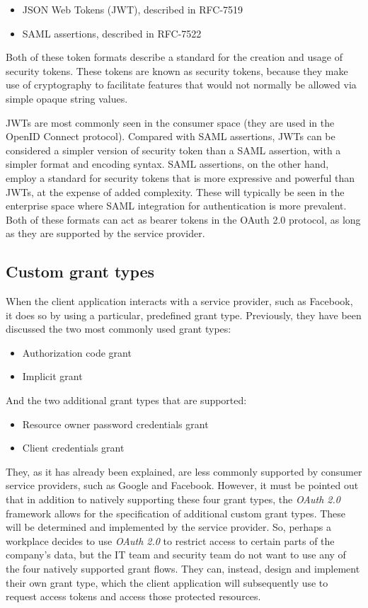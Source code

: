 \begin{itemize}
    \item JSON Web Tokens (JWT), described in RFC-7519 \cite{RFC7519}
    \item SAML assertions, described in RFC-7522
\end{itemize}

Both of these token formats describe a standard for the creation and usage of security tokens. These tokens are known as security tokens, because they make use of cryptography to facilitate features that would not normally be allowed via simple opaque string values.

JWTs are most commonly seen in the consumer space (they are used in the OpenID Connect protocol). Compared with SAML assertions, JWTs can be considered a simpler version of security token than a SAML assertion, with a simpler format and encoding syntax. SAML assertions, on the other hand, employ a standard for security tokens that is more expressive and powerful than JWTs, at the expense of added complexity. These will typically be seen in the enterprise space where SAML integration for authentication is more prevalent. Both of these formats can act as bearer tokens in the OAuth 2.0 protocol, as long as they are supported by the service provider.


\subsection{Custom grant types}
When the client application interacts with a service provider, such as Facebook, it does so by using a particular, predefined grant type. Previously, they have been discussed the two most commonly used grant types:

\begin{itemize}
    \item Authorization code grant
    \item Implicit grant
\end{itemize}

\noindent And the two additional grant types that are supported:

\begin{itemize}
    \item Resource owner password credentials grant
    \item Client credentials grant
\end{itemize}

\noindent They, as it has already been explained, are less commonly supported by consumer service providers, such as Google and Facebook. However, it must be pointed out that in addition to natively supporting these four grant types, the \textit{OAuth 2.0} framework allows for the specification of additional custom grant types. These will be determined and implemented by the service provider. So, perhaps a workplace decides to use \textit{OAuth 2.0} to restrict access to certain parts of the company's data, but the IT team and security team do not want to use any of the four natively supported grant flows. They can, instead, design and implement their own grant type, which the client application will subsequently use to request access tokens and access those protected resources.

